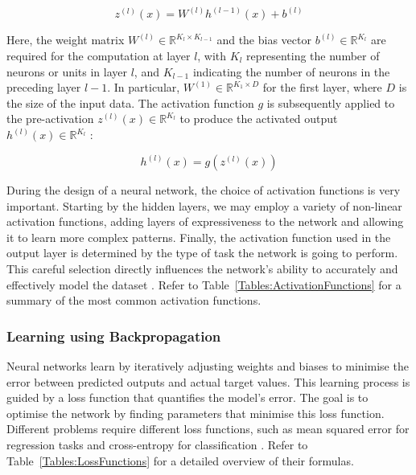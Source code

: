 \begin{equation}
z^{(l)}(x) = W^{(l)} h^{(l-1)}(x) + b^{(l)}
\end{equation}

Here, the weight matrix \( W^{(l)} \in \mathbb{R}^{K_l \times K_{l-1}} \) and the bias vector \( b^{(l)} \in \mathbb{R}^{K_l} \) are required for the computation at layer \( l \), with \( K_l \) representing the number of neurons or units in layer \( l \), and \( K_{l-1} \) indicating the number of neurons in the preceding layer \( l-1 \). In particular, \( W^{(1)} \in \mathbb{R}^{K_1 \times D} \) for the first layer, where \( D \) is the size of the input data. The activation function \( g \) is subsequently applied to the pre-activation \( z^{(l)}(x) \in \mathbb{R}^{K_l} \) to produce the activated output \( h^{(l)}(x) \in \mathbb{R}^{K_l} \) \cite{goodfellow_deep_2016}:

\begin{equation}
h^{(l)}(x) = g(z^{(l)}(x))
\end{equation}

During the design of a neural network, the choice of activation functions is very important. Starting by the hidden layers, we may employ a variety of non-linear activation functions, adding layers of expressiveness to the network and allowing it to learn more complex patterns. Finally, the activation function used in the output layer is determined by the type of task the network is going to perform. This careful selection directly influences the network's ability to accurately and effectively model the dataset \cite{goodfellow_deep_2016}. Refer to Table~\ref{Tables:ActivationFunctions} for a summary of the most common activation functions.



\subsubsection{Learning using Backpropagation}

Neural networks learn by iteratively adjusting weights and biases to minimise the error between predicted outputs and actual target values. This learning process is guided by a loss function that quantifies the model's error. The goal is to optimise the network by finding parameters that minimise this loss function. Different problems require different loss functions, such as mean squared error for regression tasks and cross-entropy for classification \cite{goodfellow_deep_2016}. Refer to Table~\ref{Tables:LossFunctions} for a detailed overview of their formulas.

